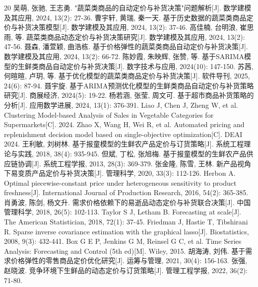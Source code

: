 \documentclass[12pt,a4paper]{article}
\begin{document}
\newpage
\begin{thebibliography}{20}
 吴萌, 张驰, 王志勇. "蔬菜类商品的自动定价与补货决策"问题解析[J]. 数学建模及其应用, 2024, 13(2): 27-36.
 曹宇轩, 黄瑞, 秦一天. 基于历史数据的蔬菜类商品定价与补货决策模型[J]. 数学建模及其应用, 2024, 13(2): 37-46.
 高佳楠, 台明浪, 崔思雨, 等. 蔬菜类商品动态定价与补货决策研究[J]. 数学建模及其应用, 2024, 13(2): 47-56.
 聂森, 潘萱颖, 曲浩栋. 基于价格弹性的蔬菜类商品自动定价与补货决策[J]. 数学建模及其应用, 2024, 13(2): 66-72.
 陈妙霞, 朱映辉, 张赞, 等. 基于SARIMA模型的生鲜类商品自动定价与补货决策[J]. 数字技术与应用, 2024(10): 147-150.
 苏茜, 何暄暄, 卢玥, 等. 基于优化模型的蔬菜类商品定价与补货决策[J]. 软件导刊, 2025, 24(6): 87-94.
 聂宇旋. 基于ARIMA预测优化模型的生鲜类商品自动定价与补货策略研究[J]. 商展经济, 2024(5): 19-22.
 杨若涵, 张莹, 周文可. 基于超市商品补货策略的分析[J]. 应用数学进展, 2024, 13(1): 376-391.
 Liao J, Chen J, Zheng W, et al. Clustering Model-based Analysis of Sales in Vegetable Categories for Supermarkets[C]. 2024.
 Zhao X, Wang H, Wei R, et al. Automated pricing and replenishment decision model based on single-objective optimization[C]. DEAI 2024.
 王利敏, 刘树林. 基于报童模型的生鲜农产品定价与订货策略[J]. 系统工程理论与实践, 2018, 38(4): 935-945.
 但斌, 丁松, 张旭梅. 基于报童模型的生鲜农产品供应链协调[J]. 系统工程学报, 2013, 28(3): 369-379.
 张金隆, 陈雪, 王林. 新产品视角下易变质产品定价与补货决策[J]. 管理科学, 2020, 33(3): 112-126.
 Herbon A. Optimal piecewise-constant price under heterogeneous sensitivity to product freshness[J]. International Journal of Production Research, 2016, 54(2): 365-385.
 肖勇波, 陈剑, 杨文升. 需求价格依赖下的易逝品动态定价与补货联合决策[J]. 中国管理科学, 2018, 26(5): 102-113.
 Taylor S J, Letham B. Forecasting at scale[J]. The American Statistician, 2018, 72(1): 37-45.
 Friedman J, Hastie T, Tibshirani R. Sparse inverse covariance estimation with the graphical lasso[J]. Biostatistics, 2008, 9(3): 432-441.
 Box G E P, Jenkins G M, Reinsel G C, et al. Time Series Analysis: Forecasting and Control (5th ed)[M]. Wiley, 2015.
 胡海涛, 刘伟. 基于需求价格弹性的零售商品定价优化研究[J]. 运筹与管理, 2021, 30(4): 156-163.
 张强, 赵晓波. 竞争环境下生鲜品的动态定价与订货策略[J]. 管理工程学报, 2022, 36(2): 71-80.
\end{thebibliography}
\end{document}

